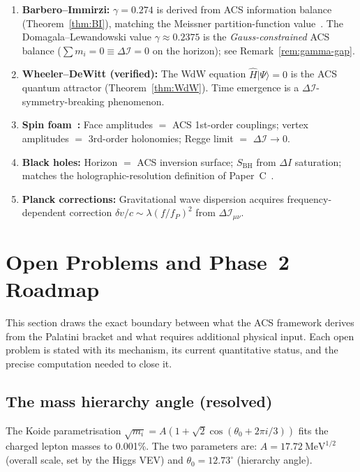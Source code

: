 \documentclass[11pt,a4paper]{article}
\theoremstyle{plain}
\theoremstyle{definition}
\theoremstyle{remark}
\newcommand{\DI}{\Delta\mathcal{I}}
\begin{document}
\begin{enumerate}[label=(P\arabic*)]
  \item \textbf{Barbero--Immirzi:} $\gamma = 0.274$ is derived from
    ACS information balance (Theorem~\ref{thm:BI}), matching the
    Meissner partition-function value~\cite{Meissner2004}.
    The Domagala--Lewandowski value $\gamma \approx 0.2375$ is the
    \emph{Gauss-constrained} ACS balance ($\sum m_i = 0 \equiv \DI = 0$
    on the horizon); see Remark~\ref{rem:gamma-gap}.
  \item \textbf{Wheeler--DeWitt (verified):} The WdW equation $\hat{H}|\Psi\rangle = 0$
    is the ACS quantum attractor (Theorem~\ref{thm:WdW}).  Time emergence is a
    $\DI$-symmetry-breaking phenomenon.
  \item \textbf{Spin foam~\cite{EPRL2008}:} Face amplitudes $=$ ACS 1st-order couplings;
    vertex amplitudes $=$ 3rd-order holonomies; Regge limit $=$ $\DI \to 0$.
  \item \textbf{Black holes:} Horizon $=$ ACS inversion surface; $S_{\text{BH}}$
    from $\Delta I$ saturation; matches the holographic-resolution
    definition of Paper~C~\cite{Wallace2026c}.
  \item \textbf{Planck corrections:} Gravitational wave dispersion acquires
    frequency-dependent correction $\delta v/c \sim \lambda (f/f_P)^2$ from $\DI_{\mu\nu}$.
\end{enumerate}


\section{Open Problems and Phase~2 Roadmap}
\label{sec:open}

This section draws the exact boundary between what the ACS framework
derives from the Palatini bracket and what requires additional physical
input.  Each open problem is stated with its mechanism, its current
quantitative status, and the precise computation needed to close it.

\subsection{The mass hierarchy angle (resolved)}

The Koide parametrisation $\sqrt{m_i} = A(1 + \sqrt{2}\cos(\theta_0 + 2\pi i/3))$
fits the charged lepton masses to 0.001\%.  The two parameters are:
$A = 17.72~\mathrm{MeV}^{1/2}$ (overall scale, set by the Higgs VEV)
and $\theta_0 = 12.73^\circ$ (hierarchy angle).
\end{document}
